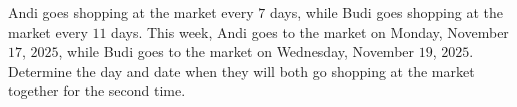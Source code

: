 Andi goes shopping at the market every $7$ days, while Budi goes shopping at the market every $11$ days. This week, Andi goes to the market on Monday, November $17$, $2025$, while Budi goes to the market on Wednesday, November $19$, $2025$. Determine the day and date when they will both go shopping at the market together for the second time.
